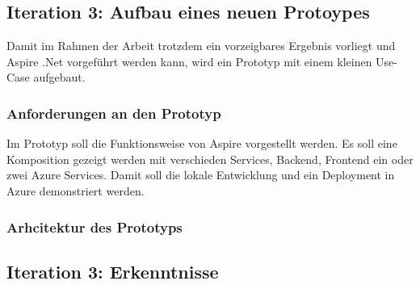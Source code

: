     \subsection{Iteration 3: Aufbau eines neuen Protoypes}
        Damit im Rahmen der Arbeit trotzdem ein vorzeigbares Ergebnis vorliegt und Aspire .Net vorgeführt werden kann, wird ein Prototyp mit einem kleinen Use-Case aufgebaut.
        
        \subsubsection{Anforderungen an den Prototyp}
        Im Prototyp soll die Funktionsweise von Aspire vorgestellt werden. Es soll eine Komposition gezeigt werden mit verschieden Services, Backend, Frontend ein oder zwei Azure Services. Damit soll die lokale Entwicklung und ein Deployment in Azure demonstriert werden.

        \subsubsection{Arhcitektur des Prototyps}
        

    \subsection{Iteration 3: Erkenntnisse}



